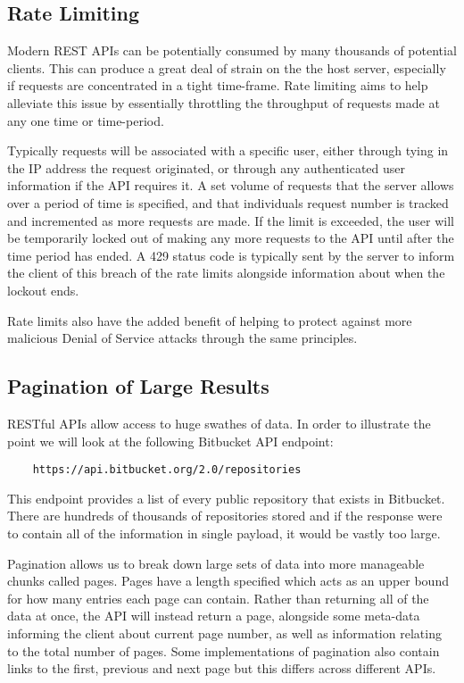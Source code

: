 \subsection{Rate Limiting}
Modern REST APIs can be potentially consumed by many thousands of potential clients. This can produce a great deal of strain on the the host server, especially if requests are concentrated in a tight time-frame. Rate limiting aims to help alleviate this issue by essentially throttling the throughput of requests made at any one time or time-period.

Typically requests will be associated with a specific user, either through tying in the IP address the request originated, or through any authenticated user information if the API requires it. A set volume of requests that the server allows over a period of time is specified, and that individuals request number is tracked and incremented as more requests are made. If the limit is exceeded, the user will be temporarily locked out of making any more requests to the API until after the time period has ended. A 429 status code is typically sent by the server to inform the client of this breach of the rate limits alongside information about when the lockout ends.

Rate limits also have the added benefit of helping to protect against more malicious Denial of Service attacks through the same principles.
\subsection{Pagination of Large Results}
RESTful APIs allow access to huge swathes of data. In order to illustrate the point we will look at the following Bitbucket API endpoint:
\begin{verbatim}
    https://api.bitbucket.org/2.0/repositories
\end{verbatim}
This endpoint provides a list of every public repository that exists in Bitbucket. There are hundreds of thousands of repositories stored and if the response were to contain all of the information in  single payload, it would be vastly too large.

Pagination allows us to break down large sets of data into more manageable chunks called pages. Pages have a length specified which acts as an upper bound for how many entries each page can contain. Rather than returning all of the data at once, the API will instead return a page, alongside some meta-data informing the client about current page number, as well as information relating to the total number of pages. Some implementations of pagination also contain links to the first, previous and next page but this differs across different APIs.

